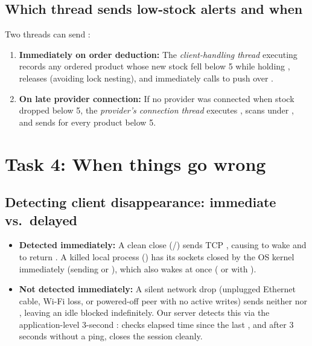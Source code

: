 \documentclass{../latex/utmreport}
\begin{document}
\subsection{Which thread sends low-stock alerts and when}
Two threads can send :
\begin{enumerate}
  \item \textbf{Immediately on order deduction:} The \emph{client-handling thread} executing  records any ordered product whose new stock fell below 5 while holding , releases  (avoiding lock nesting), and immediately calls  to push  over .
  \item \textbf{On late provider connection:} If no provider was connected when stock dropped below 5, the \emph{provider's connection thread} executes , scans  under , and sends  for every product below 5.
\end{enumerate}

\section{Task 4: When things go wrong}
\subsection{Detecting client disappearance: immediate vs.\ delayed}
\begin{itemize}
  \item \textbf{Detected immediately:} A clean close (/) sends TCP , causing  to wake and  to return . A killed local process () has its sockets closed by the OS kernel immediately (sending  or ), which also wakes  at once ( or  with ).
  \item \textbf{Not detected immediately:} A silent network drop (unplugged Ethernet cable, Wi-Fi loss, or powered-off peer with no active writes) sends neither  nor , leaving an idle  blocked indefinitely. Our server detects this via the application-level 3-second :  checks elapsed time since the last , and after 3\,seconds without a ping, closes the session cleanly.
\end{itemize}
\end{document}
